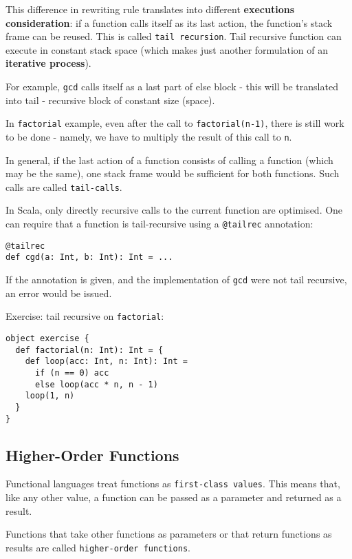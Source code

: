 \documentclass{scrartcl}
\newcommand{\term}[1]{\verb~#1~} %
\begin{document}
This difference in rewriting rule translates into different {\bf executions
  consideration}: if a function calls itself as its last action, the function's
stack frame can be reused. This is called \term{tail recursion}. Tail recursive
function can execute in constant stack space (which makes just another
formulation of an {\bf iterative process}).

For example, \lstinline|gcd| calls itself as a last part of else block - this
will be translated into tail - recursive block of constant size (space).

In \lstinline|factorial| example, even after the call to
\lstinline|factorial(n-1)|, there is still work to be done - namely, we have to
multiply the result of this call to \lstinline|n|.

In general, if the last action of a function consists of calling a function
(which may be the same), one stack frame would be sufficient for both functions.
Such calls are called \term{tail-calls}.

In Scala, only directly recursive calls to the current function are optimised.
One can require that a function is tail-recursive using a \lstinline|@tailrec|
annotation:
\begin{lstlisting}
@tailrec
def cgd(a: Int, b: Int): Int = ...
\end{lstlisting}

If the annotation is given, and the implementation of \lstinline|gcd| were not
tail recursive, an error would be issued.

Exercise: tail recursive on \lstinline|factorial|:
\begin{lstlisting}
object exercise {
  def factorial(n: Int): Int = {
    def loop(acc: Int, n: Int): Int = 
      if (n == 0) acc
      else loop(acc * n, n - 1)
    loop(1, n)
  }
}
\end{lstlisting}

\subsection{Higher-Order Functions}
\label{sec:Lection2-HigherOrderFunctions}

Functional languages treat functions as \term{first-class values}. This means
that, like any other value, a function can be passed as a parameter and returned
as a result.

Functions that take other functions as parameters or that return functions as
results are called \term{higher-order functions}.
\end{document}
